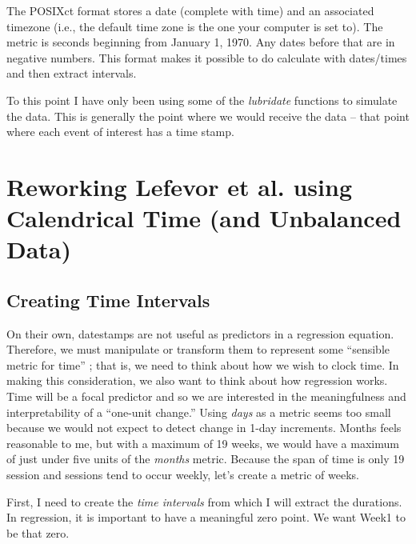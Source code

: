 \documentclass[
  11pt,
]{book}
\begin{document}
The POSIXct format stores a date (complete with time) and an associated timezone (i.e., the default time zone is the one your computer is set to). The metric is seconds beginning from January 1, 1970. Any dates before that are in negative numbers. This format makes it possible to do calculate with dates/times and then extract intervals.

To this point I have only been using some of the \emph{lubridate} functions to simulate the data. This is generally the point where we would receive the data -- that point where each event of interest has a time stamp.

\hypertarget{reworking-lefevor-et-al.--lefevor_religious_2017-using-calendrical-time-and-unbalanced-data}{%
\section{\texorpdfstring{Reworking Lefevor et al. \citeyearpar{lefevor_religious_2017} using Calendrical Time (and Unbalanced Data)}{Reworking Lefevor et al. {[}-@lefevor\_religious\_2017{]} using Calendrical Time (and Unbalanced Data)}}\label{reworking-lefevor-et-al.--lefevor_religious_2017-using-calendrical-time-and-unbalanced-data}}

\hypertarget{creating-time-intervals}{%
\subsection{Creating Time Intervals}\label{creating-time-intervals}}

On their own, datestamps are not useful as predictors in a regression equation. Therefore, we must manipulate or transform them to represent some ``sensible metric for time'' \citep{singer_applied_2003}; that is, we need to think about how we wish to clock time. In making this consideration, we also want to think about how regression works. Time will be a focal predictor and so we are interested in the meaningfulness and interpretability of a ``one-unit change.'' Using \emph{days} as a metric seems too small because we would not expect to detect change in 1-day increments. Months feels reasonable to me, but with a maximum of 19 weeks, we would have a maximum of just under five units of the \emph{months} metric. Because the span of time is only 19 session and sessions tend to occur weekly, let's create a metric of weeks.

First, I need to create the \emph{time intervals} from which I will extract the durations. In regression, it is important to have a meaningful zero point. We want Week1 to be that zero.
\end{document}
